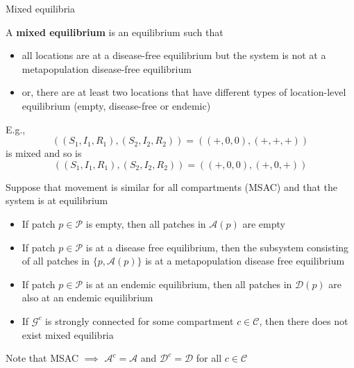 \documentclass[aspectratio=169]{beamer}\usepackage[]{graphicx}\usepackage[]{xcolor}
\begin{document}
\begin{frame}{Mixed equilibria}
	\begin{definition}
		A \textbf{mixed equilibrium} is an equilibrium such that
		\begin{itemize}
			\item all locations are at a disease-free equilibrium but the system is not at a metapopulation disease-free equilibrium
			\item or, there are at least two locations that have different types of location-level equilibrium (empty, disease-free or endemic)
		\end{itemize}
	\end{definition}
	E.g., 
	$$
	((S_1,I_1,R_1),(S_2,I_2,R_2))=((+,0,0),(+,+,+))
	$$
	is mixed and so is
	$$
	((S_1,I_1,R_1),(S_2,I_2,R_2))=((+,0,0),(+,0,+))
	$$
\end{frame}


\begin{frame}
	\begin{theorem}
		Suppose that movement is similar for all compartments (MSAC) and that the system is at equilibrium
		\begin{itemize}
			\item If patch $p\in\mathcal{P}$ is empty, then all patches in $\mathcal{A}(p)$ are empty 
			\item If patch $p\in\mathcal{P}$ is at a disease free equilibrium, then the subsystem consisting of all patches in $\{p,\mathcal{A}(p)\}$ is at a metapopulation disease free equilibrium 
			\item If patch $p\in\mathcal{P}$ is at an endemic equilibrium, then all patches in $\mathcal{D}(p)$ are also at an endemic equilibrium
			\item If $\mathcal{G}^c$ is strongly connected for some compartment $c\in\mathcal{C}$, then there does not exist mixed equilibria
		\end{itemize}
	\end{theorem}
	Note that MSAC $\implies$ $\mathcal{A}^c=\mathcal{A}$ and $\mathcal{D}^c=\mathcal{D}$ for all $c\in\mathcal{C}$
\end{frame}
\end{document}
